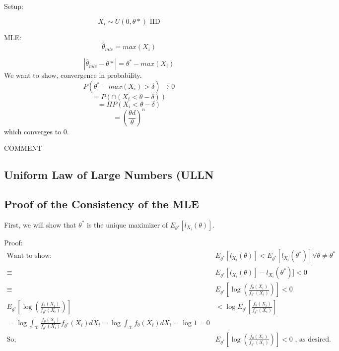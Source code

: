 \documentclass[aos,preprint]{imsart}
\numberwithin{equation}{section}
\theoremstyle{plain}
\begin{document}
Setup: 

$$ X_i \sim U(0,\theta*) \text{ IID}$$

MLE: 
$$ \hat \theta_{mle} = max(X_i) $$

$$ |\hat \theta_{mle} - \theta* | = \theta^* - max(X_i) $$
We want to show, convergence in probability. 
$$ P( \theta^* - max(X_i) >\delta) \rightarrow 0 $$
$$ = P( \cap ( X_i < \theta - \delta)) $$
$$ = \Pi P(  X_i < \theta - \delta) $$
$$ =  (\frac{\theta d}{\theta})^n$$ which converges to 0. 

COMMENT 


\subsection{Uniform Law of Large Numbers (ULLN}



\subsection{Proof of the Consistency of the MLE}

First, we will show that $\theta^*$ is the unique maximizer of $E_{\theta^*} [l_{X_i} (\theta)]$.

Proof:
\begin{align}
	\text{Want to show: } & E_{\theta^*} [l_{X_i} (\theta)] < E_{\theta^*} [l_{X_i} (\theta^*)] \forall \theta \neq \theta^* \\
	\equiv & E_{\theta^*} [l_{X_i} (\theta)] - l_{X_i} (\theta^*)] < 0 \\
	\equiv & E_{\theta^*} [\log (\frac{f_\theta (X_i)}{f_{\theta^*} (X_i)})] < 0 \\
	E_{\theta^*} [\log (\frac{f_\theta (X_i)}{f_{\theta^*} (X_i)})] & < \log E_{\theta^*} [\frac{f_\theta (X_i)}{f_{\theta^*} (X_i)}] \tag{Jensen's Inequality} \\
	= \log \int_{\mathcal{X}}^{} \frac{f_\theta (X_i)}{f_{\theta^*} (X_i)} f_{\theta^*} (X_i) dX_i = \log \int_{\mathcal{X}}^{} f_\theta (X_i) dX_i = \log 1 = 0 \\
	\text{So, } & E_{\theta^*} [\log (\frac{f_\theta (X_i)}{f_{\theta^*} (X_i)})] < 0 \text{ , as desired.}
\end{align}
\end{document}
